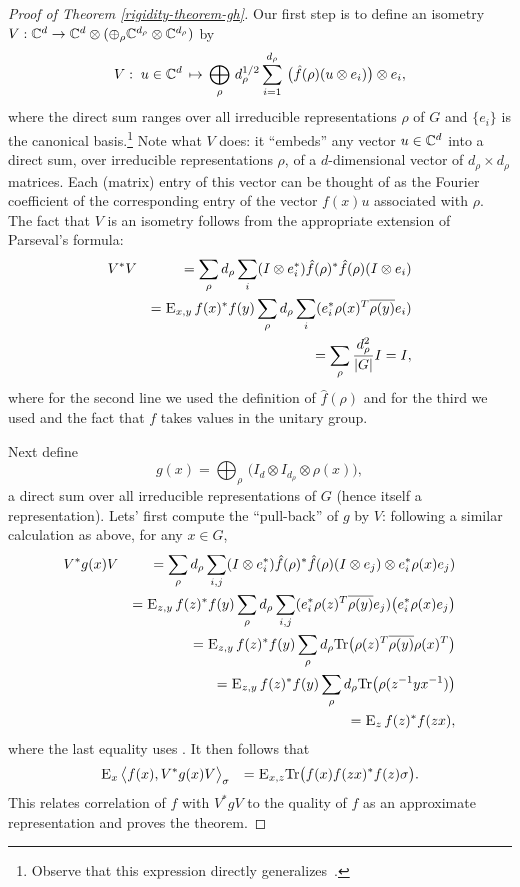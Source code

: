 \begin{proof}[Proof of Theorem \ref{rigidity-theorem-gh}]
Our first step is to define an isometry $V:\mathbb{C}^d \to \mathbb{C}^d \otimes (\oplus_\rho \mathbb{C}^{d_\rho} \otimes \mathbb{C}^{d_\rho})$ by
$$ V :\;u \in \mathbb{C}^d \,\mapsto\, \bigoplus_\rho \,d_\rho^{1/2} \sum_{i=1}^{d_\rho} \,\big(\hat{f}(\rho) (u\otimes e_i)\big) \otimes e_i,$$
where the direct sum ranges over all irreducible representations $\rho$ of $G$ and $\{e_i\}$ is the canonical basis.\footnote{Observe that this expression directly generalizes~.}
Note what $V$ does: it ``embeds'' any vector $u\in \mathbb{C}^d$ into a direct sum, over irreducible representations $\rho$, of a $d$-dimensional vector of $d_\rho\times d_\rho$ matrices. Each (matrix) entry of this vector can be thought of as the Fourier coefficient of the corresponding entry of the vector $f(x)u$ associated with $\rho$. 
The fact that $V$ is an isometry follows from the appropriate extension of Parseval's formula:  
\begin{eqnarray*}
& V^* V &= \sum_\rho d_\rho \sum_i (I\otimes e_i^*) \hat{f}(\rho)^*\hat{f}(\rho) (I\otimes e_i)\\
&&= \textsc{E}_{x,y}\,  f(x)^*f(y) \sum_\rho d_\rho \sum_i  (e_i^* \rho(x)^T \overline{\rho(y)} e_i)\\
&&= \sum_\rho \frac{d_\rho^2}{|G|}I = I,
\end{eqnarray*}
where for the second line we used the definition  of $\hat{f}(\rho)$ and  for the third we used  and the fact that $f$ takes values in the unitary group.

Next define
$$g(x) = \bigoplus_\rho \,\big(I_d \otimes I_{d_\rho} \otimes \rho(x)\big), $$
a direct sum over all irreducible representations of $G$ (hence itself a representation). Lets' first compute the ``pull-back'' of $g$ by $V$: following a similar calculation as above, for any $x\in G$, 
\begin{eqnarray*}
& V^*g(x) V  &=  \sum_{\rho}  d_\rho \sum_{i,j} (I\otimes e_i^*)\hat{f}(\rho)^* \hat{f}(\rho)(I\otimes e_j) \otimes e_i^* \rho(x) e_j ) \\
&& =  \textsc{E}_{z,y}\,  f(z)^*f(y)  \sum_{\rho}  d_\rho \sum_{i,j} (e_i^* \rho(z)^T \overline{\rho(y)} e_j) \big( e_i^* \rho(x) e_j \big) \\
&& =  \textsc{E}_{z,y}\,  f(z)^*f(y)  \sum_{\rho}  d_\rho \mathrm{Tr}\big( \rho(z)^T \overline{\rho(y)}  {\rho(x)^T} \big) \\
&& =  \textsc{E}_{z,y}\,  f(z)^*f(y)  \sum_{\rho}  d_\rho \mathrm{Tr}\big( \rho(z^{-1}y x^{-1}) \big) \\
&& =  \textsc{E}_{z}\,  f(z)^*f(zx) , 
\end{eqnarray*}
where the last equality uses .
It then follows that 
\begin{eqnarray*}
&\textsc{E}_{x}\, \big\langle f(x), V^*g(x) V \big\rangle_\sigma &=  \textsc{E}_{x,z} \mathrm{Tr}\big( f(x) f(zx)^* f(z)\sigma\big).
\end{eqnarray*}  
This relates correlation of $f$ with $V^*gV$ to the quality of $f$ as an approximate representation and proves the theorem. 
\end{proof}


